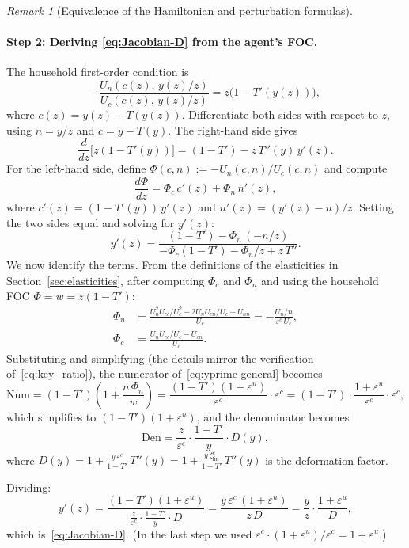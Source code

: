 \documentclass[12pt,a4paper]{article}
\theoremstyle{definition}
\theoremstyle{plain}
\theoremstyle{remark}
\newtheorem{remark}{Remark}[section]
\begin{document}
\begin{remark}[Equivalence of the Hamiltonian and perturbation formulas]
  \paragraph{Step 2: Deriving \eqref{eq:Jacobian-D} from the agent's FOC.}
  The household first-order condition is
  \begin{equation}
  \label{eq:agent-foc-equiv}
    -\frac{U_n(c(z),\, y(z)/z)}{U_c(c(z),\, y(z)/z)} = z\bigl(1-T'(y(z))\bigr),
  \end{equation}
  where $c(z) = y(z) - T(y(z))$. Differentiate both sides with respect to $z$, using $n = y/z$ and $c = y - T(y)$. The right-hand side gives
  \[
    \frac{d}{dz}\bigl[z(1-T'(y))\bigr] = (1-T') - z\,T''(y)\,y'(z).
  \]
  For the left-hand side, define $\Phi(c,n) := -U_n(c,n)/U_c(c,n)$ and compute
  \[
    \frac{d\Phi}{dz} = \Phi_c\,c'(z) + \Phi_n\,n'(z),
  \]
  where $c'(z) = (1-T'(y))\,y'(z)$ and $n'(z) = (y'(z) - n)/z$. Setting the two sides equal and solving for $y'(z)$:
  \begin{equation}
  \label{eq:yprime-general}
    y'(z) = \frac{(1-T') - \Phi_n\,(-n/z)}{-\Phi_c(1-T') - \Phi_n/z + z\,T''}.
  \end{equation}
  We now identify the terms. From the definitions of the elasticities in Section~\ref{sec:elasticities}, after computing $\Phi_c$ and $\Phi_n$ and using the household FOC $\Phi = w = z(1-T')$:
  \begin{align*}
    \Phi_n &= \frac{U_n^2 U_{cc}/U_c^2 - 2U_n U_{cn}/U_c + U_{nn}}{U_c}
    = -\frac{U_n/n}{\varepsilon^c \, U_c}, \\
    \Phi_c &= \frac{U_n U_{cc}/U_c - U_{cn}}{U_c}.
  \end{align*}
  Substituting and simplifying (the details mirror the verification of~\eqref{eq:key_ratio}), the numerator of~\eqref{eq:yprime-general} becomes
  \[
    \text{Num} = (1-T')\left(1 + \frac{n\,\Phi_n}{w}\right) = \frac{(1-T')(1+\varepsilon^u)}{\varepsilon^c} \cdot \varepsilon^c = (1-T')\cdot\frac{1+\varepsilon^u}{\varepsilon^c}\cdot\varepsilon^c,
  \]
  which simplifies to $(1-T')(1+\varepsilon^u)$, and the denominator becomes
  \[
    \text{Den} = \frac{z}{\varepsilon^c}\cdot\frac{1-T'}{y}\cdot D(y),
  \]
  where $D(y) = 1 + \frac{y\,\varepsilon^c}{1-T'}\,T''(y) = 1 + \frac{y\,\zeta^c_{\mathrm{lin}}}{1-T'}\,T''(y)$ is the deformation factor.
  
  Dividing:
  \[
    y'(z) = \frac{(1-T')(1+\varepsilon^u)}{\frac{z}{\varepsilon^c}\cdot\frac{1-T'}{y}\cdot D}
    = \frac{y\,\varepsilon^c\,(1+\varepsilon^u)}{z\,D}
    = \frac{y}{z}\cdot\frac{1+\varepsilon^u}{D},
  \]
  which is~\eqref{eq:Jacobian-D}. (In the last step we used $\varepsilon^c \cdot (1+\varepsilon^u)/\varepsilon^c = 1+\varepsilon^u$.)
  

\end{remark}
\end{document}

